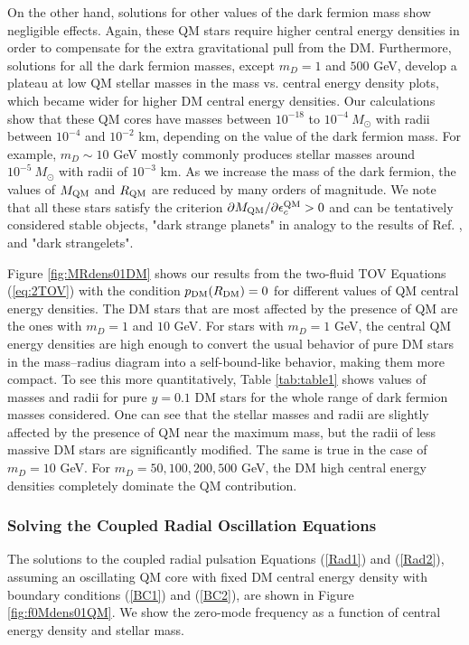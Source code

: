 \documentclass[universe,article,accept,moreauthors,pdftex]{Definitions/mdpi}
\begin{document}
On the other hand, solutions for other values of the dark fermion mass show negligible effects. Again, these QM stars require higher central energy densities in order to compensate for the extra gravitational pull from the DM. Furthermore, solutions for all the dark fermion masses, except $m_{D}=1$ and $500$ GeV, develop a plateau at low QM stellar masses in the mass vs. central energy density plots, which became wider for higher DM central energy densities. Our calculations show that these QM cores have masses between $10^{-18}$ to $10^{-4}~M_{\odot}$ with radii between $10^{-4}$ and $10^{-2}$ km, depending on the value of the dark fermion mass. For example, $m_{D}\sim 10$ GeV mostly commonly produces  stellar masses around $10^{-5}~M_{\odot}$ with radii of $10^{-3}$ km. As we increase the mass of the dark fermion, the values of $M_{\rm QM}$ and $R_{\rm QM}$  are reduced by many orders of magnitude. We note that all these stars satisfy the criterion $\partial{M}_{\rm QM}/\partial{\epsilon^{\rm QM}_{c}}>0$ and can be tentatively considered stable objects, "dark strange planets" in analogy to the results of Ref. \cite{Tolos:2015qra}, and "dark strangelets".

Figure \ref{fig:MRdens01DM} shows our results from the two-fluid TOV Equations (\ref{eq:2TOV}) with the condition $p_{\rm DM}(R_{\rm DM})=0$ for different values of QM central energy densities. The DM stars that are most affected by the presence of QM are the ones with $m_{D}=1$ and $10$ GeV. For stars with $m_{D}= 1$ GeV, the central QM energy densities are high enough to convert the usual behavior of pure DM stars in the mass--radius diagram into a self-bound-like behavior, making them more compact. To see this more quantitatively, Table \ref{tab:table1} shows values of masses and radii for pure $y=0.1$ DM stars for the whole range of dark fermion masses considered. One can see that the stellar masses and radii are slightly affected by the presence of QM near the maximum mass, but the radii of less massive DM stars are significantly modified. The same is true in the case of $m_{D}=10$ GeV. For $m_{D}=50, 100, 200, 500$ GeV, the DM high central energy densities completely dominate the QM contribution.


\subsubsection{Solving the Coupled Radial Oscillation Equations}


The solutions to the coupled radial pulsation Equations (\ref{Rad1}) and (\ref{Rad2}), assuming an oscillating QM core with fixed DM central energy density with boundary conditions (\ref{BC1}) and (\ref{BC2}), are shown in Figure \ref{fig:f0Mdens01QM}. We show the zero-mode frequency as a function of central energy density and stellar mass. 
\end{document}
